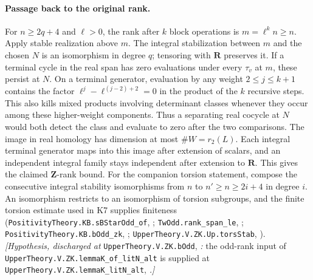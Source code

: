 \paragraph{Passage back to the original rank.}
For $n\ge 2q+4$ and $\ell>0$, the rank after $k$ block operations is
$m=\ell^kn\ge n$. Apply stable realization above $m$. The integral
stabilization between $m$ and the chosen $N$ is an isomorphism in
degree $q$; tensoring with $\mathbf R$ preserves it. If a terminal
cycle in the real span has zero evaluations under every $\tau_v$ at
$m$, these persist at $N$. On a terminal generator, evaluation by
any weight $2\le j\le k+1$ contains the factor
$\ell^j-\ell^{(j-2)+2}=0$ in the product of the $k$ recursive steps.
This also kills mixed products involving determinant classes whenever
they occur among these higher-weight components. Thus a separating
real cocycle at $N$ would both detect the class and evaluate to zero
after the two comparisons. The image in real homology has dimension
at most $\#W=r_2(L)$. Each integral terminal generator maps into this
image after extension of scalars, and an independent integral family
stays independent after extension to $\mathbf R$. This gives the
claimed $\mathbf Z$-rank bound. For the companion torsion statement,
compose the consecutive integral stability isomorphisms from $n$ to
$n'\ge n\ge2i+4$ in degree $i$. An isomorphism restricts to an
isomorphism of torsion subgroups, and the finite torsion estimate used
in K7 supplies finiteness
(\nolinkurl{PositivityTheory.KB.sBStarOdd_of}, ;
\nolinkurl{TwOdd.rank_span_le}, ;
\nolinkurl{PositivityTheory.KB.bOdd_zk}, ;
\nolinkurl{UpperTheory.V.ZK.Up.torsStab}, ).
\textit{[Hypothesis, discharged at}
\nolinkurl{UpperTheory.V.ZK.bOdd}, \textit{:}
the odd-rank input of \nolinkurl{UpperTheory.V.ZK.lemmaK_of_litN_alt}
is supplied at \nolinkurl{UpperTheory.V.ZK.lemmaK_litN_alt},
\textit{.]}

